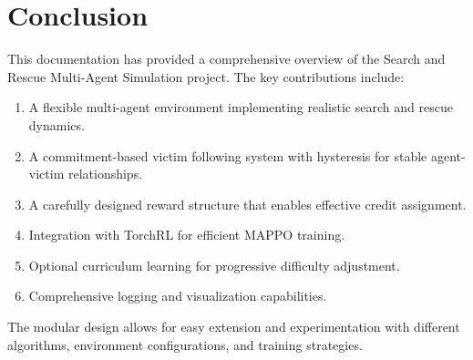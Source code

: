 \documentclass[11pt,a4paper]{article}
\begin{document}
\section{Conclusion}
\label{sec:conclusion}

This documentation has provided a comprehensive overview of the Search and Rescue Multi-Agent Simulation project.
The key contributions include:

\begin{enumerate}
    \item A flexible multi-agent environment implementing realistic search and rescue dynamics.
    \item A commitment-based victim following system with hysteresis for stable agent-victim relationships.
    \item A carefully designed reward structure that enables effective credit assignment.
    \item Integration with TorchRL for efficient MAPPO training.
    \item Optional curriculum learning for progressive difficulty adjustment.
    \item Comprehensive logging and visualization capabilities.
\end{enumerate}

The modular design allows for easy extension and experimentation with different algorithms, environment configurations, and training strategies.
\end{document}
